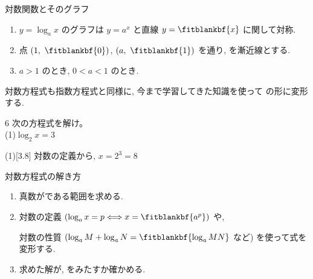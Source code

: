 \documentclass[14pt,dvipdfmx]{jsarticle}
\begin{document}

\vspace{-1.8zw}
\vspace{-0.55em}
\begin{reviewbox}{対数関数とそのグラフ}
  \begin{enumerate}[label=\textbf{\arabic*}, leftmargin=1.5zw, itemsep=0.02em]
    \item $y=\log_{a} x$ のグラフは $y=a^{x}$ と直線 $y=\fitblankbf{x}$ に関して対称.
    \item 点 $(1,\ \fitblankbf{0})$, $(a,\ \fitblankbf{1})$ を通り, を漸近線とする.
    \item $a>1$ のとき, $0<a<1$ のとき.
  \end{enumerate}
\end{reviewbox}

\vspace{-0.25em}
対数方程式も指数方程式と同様に, 今まで学習してきた知識を使って  の形に変形する.

\begin{exampleprob}{6}
  次の方程式を解け。\\
  (1)\quad $\log_{2} x = 3$
\end{exampleprob}
\begin{answerbox}{(1)}[3.8]
  対数の定義から, \qquad $x=2^{3}=8$
\end{answerbox}

\vspace{1.2em}
\begin{techniquebox}{対数方程式の解き方}
  \begin{enumerate}[label=\textbf{\arabic*}, leftmargin=1.5zw, itemsep=0.02em]
    \item 真数がである範囲を求める.
    \item 対数の定義 $(\log_{a} x = p \Longleftrightarrow x = \fitblankbf{a^{p}})$ や,

    対数の性質 $(\log_{a} M+\log_{a} N=\fitblankbf{\log_{a} MN}$ など) を使って式を変形する.
    \item 求めた解が, をみたすか確かめる.
  \end{enumerate}
\end{techniquebox}
\end{document}
